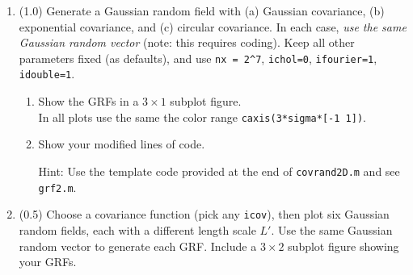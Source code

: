 \documentclass[11pt,titlepage,fleqn]{article}
\begin{document}
\begin{enumerate}
\item (1.0) Generate a Gaussian random field with (a) Gaussian covariance, (b) exponential covariance, and (c) circular covariance. In each case, {\em use the same Gaussian random vector} (note: this requires coding). Keep all other parameters fixed (as defaults), and use \verb+nx = 2^7+, \verb+ichol=0+, \verb+ifourier=1+, \verb+idouble=1+. 
%
\begin{enumerate}
\item Show the GRFs in a $3 \times 1$ subplot figure. \\
In all plots use the same the color range \verb+caxis(3*sigma*[-1 1])+.

\item Show your modified lines of code.

Hint: Use the template code provided at the end of \verb+covrand2D.m+ and see \verb+grf2.m+.
\end{enumerate}

\item (0.5) Choose a covariance function (pick any \verb+icov+), then plot six Gaussian random fields, each with a different length scale $L'$. Use the same Gaussian random vector to generate each GRF. Include a $3 \times 2$ subplot figure showing your GRFs.

\end{enumerate}








\end{document}
